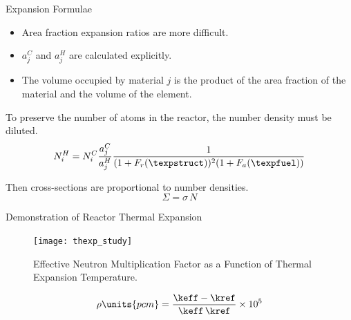 \begin{frame}{Expansion Formulae}
  \begin{itemize}
    \item Area fraction expansion ratios are more difficult.
    \item $a_j^C$ and $a_j^H$ are calculated explicitly.
    \item The volume occupied by material $j$ is the product of the 
      area fraction of the material and the volume of the element.
  \end{itemize}

  To preserve the number of atoms in the reactor, the number density must be
  diluted.
  \begin{equation}
    \label{eq:nden_thexp_update}
    N_i^H = N_i^C \frac{a_j^C}{a_j^H} 
      \frac{1}{(1+F_r(\texpstruct))^2 (1+F_a(\texpfuel))}
  \end{equation}

  Then cross-sections are proportional to number densities.
  \begin{equation}
    \Sigma = \sigma \, N
  \end{equation}
\end{frame}

\begin{frame}{Demonstration of Reactor Thermal Expansion}
  \begin{figure}
    \centering
    \texttt{[image: thexp\_study]}
    \caption{Effective Neutron Multiplication Factor as a Function of 
      Thermal Expansion Temperature.}
    \label{fig:thexp_study}
  \end{figure}
  \begin{equation}
    \label{eq:reactivity_formula}
    \rho \units{pcm} = \frac{\keff - \kref}{\keff \, \kref} \times 10^5
  \end{equation}
\end{frame}
